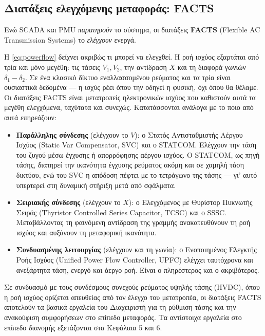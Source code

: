\subsection{Διατάξεις ελεγχόμενης μεταφοράς: FACTS}

Ενώ SCADA και PMU \emph{παρατηρούν} το σύστημα, οι διατάξεις \textbf{FACTS} (Flexible AC
Transmission Systems) το \emph{ελέγχουν} ενεργά.

Η \eqref{eq:powerflow} δείχνει ακριβώς τι μπορεί να ελεγχθεί. Η ροή ισχύος εξαρτάται από
τρία και μόνο μεγέθη: τις τάσεις $V_1, V_2$, την αντίδραση $X$ και τη διαφορά γωνιών
$\delta_1 - \delta_2$. Σε ένα κλασικό δίκτυο εναλλασσομένου ρεύματος και τα τρία είναι
ουσιαστικά δεδομένα — η ισχύς ρέει όπου την οδηγεί η φυσική, όχι όπου θα θέλαμε. Οι
διατάξεις FACTS είναι μετατροπείς ηλεκτρονικών ισχύος που καθιστούν αυτά τα μεγέθη
ελεγχόμενα, ταχύτατα και συνεχώς. Κατατάσσονται ανάλογα με το ποιο από αυτά επηρεάζουν:

\begin{itemize}
\item \textbf{Παράλληλης σύνδεσης} (ελέγχουν το $V$): ο Στατός Αντισταθμιστής Αέργου Ισχύος
      (Static Var Compensator, SVC) και ο STATCOM. Ελέγχουν την τάση του ζυγού μέσω έγχυσης
      ή απορρόφησης αέργου ισχύος. Ο STATCOM, ως πηγή τάσης, διατηρεί την ικανότητα έγχυσης
      ρεύματος ακόμη και σε χαμηλή τάση δικτύου, ενώ του SVC η απόδοση πέφτει με το
      τετράγωνο της τάσης — γι' αυτό υπερτερεί στη δυναμική στήριξη μετά από σφάλματα.
\item \textbf{Σειριακής σύνδεσης} (ελέγχουν το $X$): ο Ελεγχόμενος με Θυρίστορ Πυκνωτής
      Σειράς (Thyristor Controlled Series Capacitor, TCSC) και ο SSSC. Μεταβάλλοντας τη
      φαινόμενη αντίδραση της γραμμής ανακατευθύνουν τη ροή ισχύος και αυξάνουν τη
      μεταφορική ικανότητα.
\item \textbf{Συνδυασμένης λειτουργίας} (ελέγχουν και τη γωνία): ο Ενοποιημένος Ελεγκτής
      Ροής Ισχύος (Unified Power Flow Controller, UPFC) ελέγχει ταυτόχρονα και ανεξάρτητα
      τάση, ενεργό και άεργο ροή. Είναι ο πληρέστερος και ο ακριβότερος.
\end{itemize}

Σε συνδυασμό με τους συνδέσμους συνεχούς ρεύματος υψηλής τάσης (HVDC), όπου η ροή ισχύος
ορίζεται απευθείας από τον έλεγχο του μετατροπέα, οι διατάξεις FACTS αποτελούν τα βασικά
εργαλεία του Διαχειριστή για τη ρύθμιση τάσης και την ανακούφιση συμφορήσεων στο επίπεδο
μεταφοράς. Τα αντίστοιχα εργαλεία στο επίπεδο διανομής εξετάζονται στα Κεφάλαια 5 και 6.

